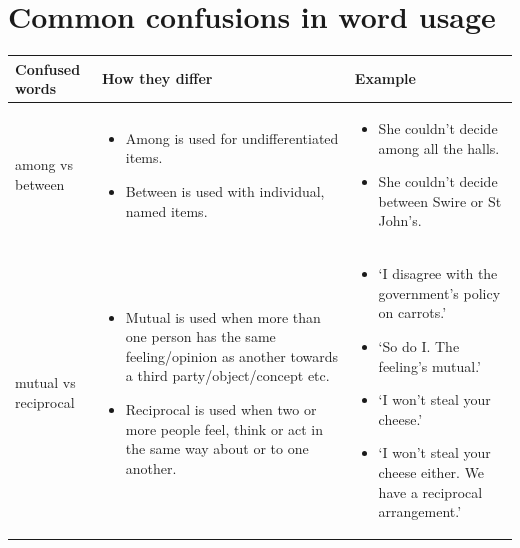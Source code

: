 \documentclass[11pt,a4paper]{book}
\begin{document}
			\section{Common confusions in word usage}
			 {\small 
			 	\renewcommand*{\arraystretch}{1.8}
			 	\begin{longtable}{p{1.5cm} | p{4.75cm} | p{4.75cm}}
			 		\toprule
			 		\textbf{Confused words} &\textbf{How they differ} & \multicolumn{1}{l}{\textbf{Example}} \\
			 		\midrule
			 		
					\noindent \mbox{among} vs \mbox{between} &
					\begin{itemize}[noitemsep,topsep=0pt,partopsep=0pt]
			 			\item Among is used for undifferentiated items.
			 			\item Between is used with individual, named items.
			 		\end{itemize}  & 
					\begin{itemize}[noitemsep,topsep=0pt,partopsep=0pt]
			 			\item She couldn't decide among all the halls.
			 			\item She couldn't decide between Swire or St John's.
			 		\end{itemize} \\ 
		 			
					\noindent \mbox{mutual} vs \mbox{reciprocal} &
					\begin{itemize}[noitemsep,topsep=0pt,partopsep=0pt]
		 				\item
		 				Mutual is used when more than one person has the same feeling/opinion as another towards a third party/object/concept etc.
		 				\item Reciprocal is used when two or more people feel, think or act in the same way about or to one another.
		 			\end{itemize}  & 
					\begin{itemize}[label=$\blacktriangle$,noitemsep,topsep=0pt,partopsep=0pt]
		 				\item `I disagree with the government's policy on carrots.' 
						\item[$\blacksquare$] `So do I. The feeling's mutual.'
		 				\item `I won't steal your cheese.'
						\item[$\blacksquare$] `I won't steal your cheese either. We have a reciprocal arrangement.'
		 			\end{itemize}\\
		 			

\end{longtable}}
\end{document}
